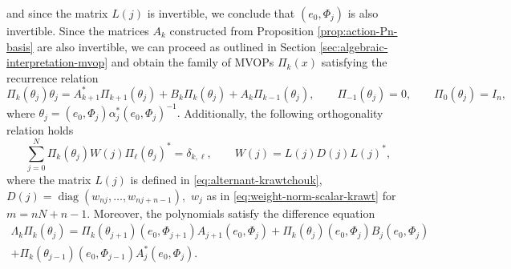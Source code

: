 \documentclass[a4paper,reqno]{amsart}
\DeclareMathOperator{\diag}{diag}
\theoremstyle{definition}
\numberwithin{equation}{section}
\begin{document}
and since the matrix $L(j)$ is invertible, we conclude that  $( e_0,\Phi_j)$ is also invertible.
Since the matrices $A_k$ constructed from Proposition \ref{prop:action-Pn-basis} are also invertible, we can proceed as outlined in Section \ref{sec:algebraic-interpretation-mvop} and obtain the family of MVOPs $\Pi_k(x)$ satisfying the recurrence relation \begin{equation}
\Pi_k(\theta_j)\theta_j=A_{k+1}^*\Pi_{k+1}(\theta_j)+B_k\Pi_k(\theta_j)+A_k\Pi_{k-1}(\theta_j), \qquad 
\Pi_{-1}(\theta_j)=0,\qquad \Pi_0(\theta_j)=I_n,
\end{equation}
where $\theta_j=( e_0, \Phi_j) \alpha_j^*( e_0, \Phi_j)^{-1}.$
Additionally, the following orthogonality relation holds
\begin{equation}
\label{eq:orth-krawtchouk-nxn}
\sum_{j=0}^N \Pi_{k}(\theta_j)W(j)\Pi_{\ell}(\theta_j)^\ast=\delta_{k,\ell},\qquad W(j)=L(j)D(j)L(j)^\ast,
\end{equation}
where the matrix $L(j)$ is defined in \eqref{eq:alternant-krawtchouk}, $D(j)=\diag(w_{nj}, \ldots, w_{nj+n-1}),$ $w_j$ as in \eqref{eq:weight-norm-scalar-krawt} for $m=nN+n-1$. Moreover, the polynomials satisfy the difference equation 
\begin{multline}
\Lambda_k\Pi_k(\theta_j)=\Pi_k(\theta_{j+1})(e_0,\Phi_{j+1})A_{j+1}(e_0,\Phi_j)+\Pi_k(\theta_{j})(e_0,\Phi_{j})B_{j}(e_0,\Phi_j)\\+\Pi_k(\theta_{j-1})(e_0,\Phi_{j-1})A_{j}^\ast(e_0,\Phi_j). 
\end{multline}
\end{document}
